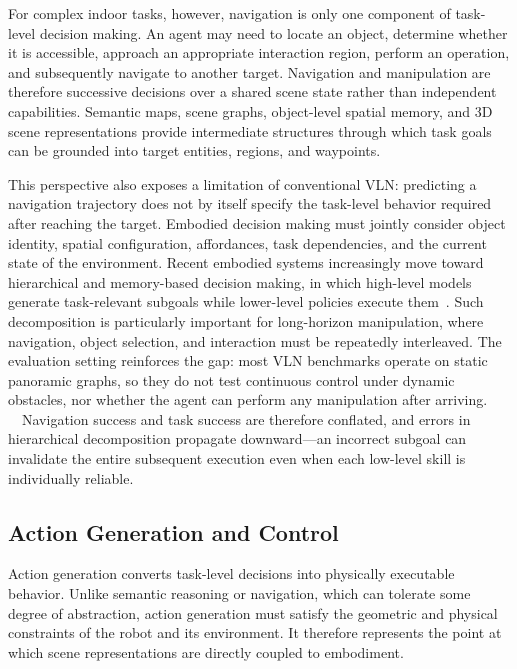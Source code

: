 \documentclass{SCIS2026}
\begin{document}
For complex indoor tasks, however, navigation is only one component of task-level decision making. An agent may need to locate an object, determine whether it is accessible, approach an appropriate interaction region, perform an operation, and subsequently navigate to another target. Navigation and manipulation are therefore successive decisions over a shared scene state rather than independent capabilities. Semantic maps, scene graphs, object-level spatial memory, and 3D scene representations provide intermediate structures through which task goals can be grounded into target entities, regions, and waypoints.

This perspective also exposes a limitation of conventional VLN: predicting a navigation trajectory does not by itself specify the task-level behavior required after reaching the target. Embodied decision making must jointly consider object identity, spatial configuration, affordances, task dependencies, and the current state of the environment. Recent embodied systems increasingly move toward hierarchical and memory-based decision making, in which high-level models generate task-relevant subgoals while lower-level policies execute them~\cite{ahn2022saycan}. Such decomposition is particularly important for long-horizon manipulation, where navigation, object selection, and interaction must be repeatedly interleaved. The evaluation setting reinforces the gap: most VLN benchmarks operate on static panoramic graphs, so they do not test continuous control under dynamic obstacles, nor whether the agent can perform any manipulation after arriving. ~\cite{hong2021vln}~\cite{savva2019habitat}Navigation success and task success are therefore conflated, and errors in hierarchical decomposition propagate downward---an incorrect subgoal can invalidate the entire subsequent execution even when each low-level skill is individually reliable.

\subsection{Action Generation and Control}
Action generation converts task-level decisions into physically executable behavior. Unlike semantic reasoning or navigation, which can tolerate some degree of abstraction, action generation must satisfy the geometric and physical constraints of the robot and its environment. It therefore represents the point at which scene representations are directly coupled to embodiment.
\end{document}
